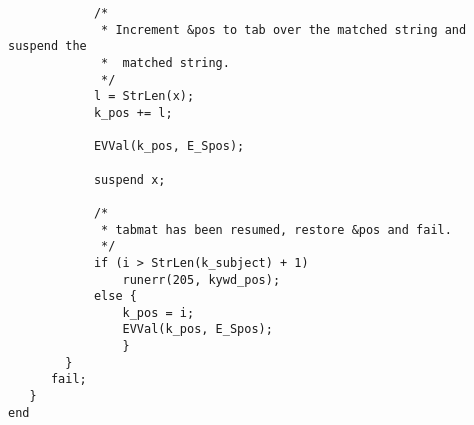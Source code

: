 \documentclass{article}
\begin{document}
\begin{verbatim}
			/*
			 * Increment &pos to tab over the matched string and suspend the
			 *  matched string.
			 */
			l = StrLen(x);
			k_pos += l;

			EVVal(k_pos, E_Spos);

			suspend x;

			/*
			 * tabmat has been resumed, restore &pos and fail.
			 */
			if (i > StrLen(k_subject) + 1)
				runerr(205, kywd_pos);
			else {
				k_pos = i;
				EVVal(k_pos, E_Spos);
				}
		}
      fail;
   }
end
\end{verbatim}

\pagebreak


\end{document}

